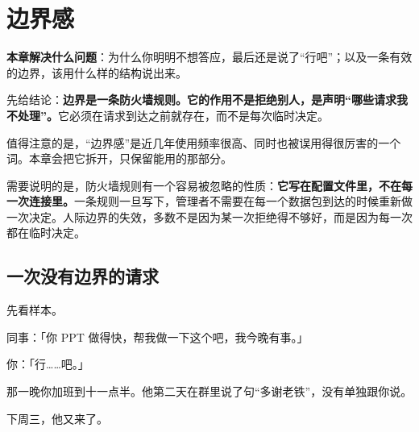 \renewcommand{\thehcisample}{%
  \ifnum\value{hcisample}<1000 0\fi
  \ifnum\value{hcisample}<100 0\fi
  \ifnum\value{hcisample}<10 0\fi
  \arabic{hcisample}}
\chapter{边界感}


\begin{guideblock}
\textbf{本章解决什么问题}：为什么你明明不想答应，最后还是说了“行吧”；以及一条有效的边界，该用什么样的结构说出来。
\end{guideblock}

先给结论：\textbf{边界是一条防火墙规则。它的作用不是拒绝别人，是声明“哪些请求我不处理”。}它必须在请求到达之前就存在，而不是每次临时决定。

值得注意的是，“边界感”是近几年使用频率很高、同时也被误用得很厉害的一个词。本章会把它拆开，只保留能用的那部分。

需要说明的是，防火墙规则有一个容易被忽略的性质：\textbf{它写在配置文件里，不在每一次连接里。}一条规则一旦写下，管理者不需要在每一个数据包到达的时候重新做一次决定。人际边界的失效，多数不是因为某一次拒绝得不够好，而是因为每一次都在临时决定。

\hcirule

\section{一次没有边界的请求}

先看样本。

\par
\begin{mdquote}
同事：「你 PPT 做得快，帮我做一下这个吧，我今晚有事。」\par
你：「行……吧。」\par
\vspace{0.3\baselineskip}
那一晚你加班到十一点半。他第二天在群里说了句“多谢老铁”，没有单独跟你说。\par
下周三，他又来了。
\end{mdquote}

